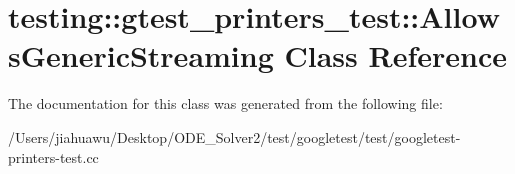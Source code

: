 \hypertarget{classtesting_1_1gtest__printers__test_1_1_allows_generic_streaming}{}\section{testing\+:\+:gtest\+\_\+printers\+\_\+test\+:\+:Allows\+Generic\+Streaming Class Reference}
\label{classtesting_1_1gtest__printers__test_1_1_allows_generic_streaming}


The documentation for this class was generated from the following file\+:\begin{DoxyCompactItemize}
\item 
/\+Users/jiahuawu/\+Desktop/\+O\+D\+E\+\_\+\+Solver2/test/googletest/test/googletest-\/printers-\/test.\+cc\end{DoxyCompactItemize}
